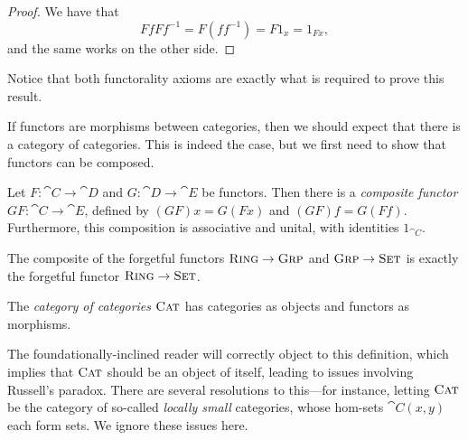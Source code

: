 \begin{proof}
  We have that \[
    FfFf^{-1} = F(ff^{-1}) = F1_x = 1_{Fx},
  \]and the same works on the other side.
\end{proof}

Notice that both functorality axioms are exactly what is required to prove this
result.

\vspace{1em}

If functors are morphisms between categories, then we should expect that there
is a category of categories. This is indeed the case, but we first need to show
that functors can be composed.

\begin{prop}
  Let $F: \cat{C}\to\cat{D}$ and $G: \cat{D}\to\cat{E}$ be functors. Then there
  is a \emph{composite functor} $GF: \cat{C}\to\cat{E}$, defined by $(GF)x =
  G(Fx)$ and $(GF)f = G(Ff)$. Furthermore, this composition is associative and
  unital, with identities $1_{\cat{C}}$.
\end{prop}

\begin{ex}
  The composite of the forgetful functors ${\textsc{\text{Ring}}}\to{\textsc{\text{Grp}}}$ and
  ${\textsc{\text{Grp}}}\to{\textsc{\text{Set}}}$ is exactly the forgetful functor
  ${\textsc{\text{Ring}}}\to{\textsc{\text{Set}}}$.
\end{ex}

\begin{dfn}
  The \emph{category of categories} ${\textsc{\text{Cat}}}$ has categories as objects and
  functors as morphisms.
\end{dfn}

The foundationally-inclined reader will correctly object to this definition,
which implies that ${\textsc{\text{Cat}}}$ should be an object of itself, leading to issues
involving Russell's paradox. There are several resolutions to this---for
instance, letting ${\textsc{\text{Cat}}}$ be the category of so-called \emph{locally small}
categories, whose hom-sets $\cat{C}(x, y)$ each form sets. We ignore these
issues here.



